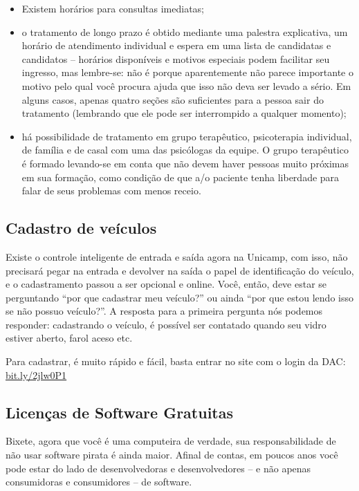 \begin{itemize}
\item Existem horários para consultas imediatas; %

\item o tratamento de longo prazo é obtido mediante uma palestra explicativa,
  um horário de atendimento individual e espera em uma lista de candidatas e
  candidatos -- horários disponíveis e motivos especiais podem facilitar seu
  ingresso, mas lembre-se: não é porque aparentemente não parece importante o
  motivo pelo qual você procura ajuda que isso não deva ser levado a sério. Em
  alguns casos, apenas quatro seções são suficientes para a pessoa sair do
  tratamento (lembrando que ele pode ser interrompido a qualquer momento);

\item há possibilidade de tratamento em grupo terapêutico, psicoterapia
  individual, de família e de casal com uma das psicólogas da equipe. O grupo
  terapêutico é formado levando-se em conta que não devem haver pessoas muito
  próximas em sua formação, como condição de que a/o paciente tenha liberdade
  para falar de seus problemas com menos receio.
\end{itemize}

\subsection{Cadastro de veículos}

Existe o controle inteligente de entrada e saída agora na Unicamp, com isso,
não precisará pegar na entrada e devolver na saída o papel de identificação do
veículo, e o cadastramento passou a ser opcional e online. Você, então, deve
estar se perguntando ``por que cadastrar meu veículo?'' ou ainda ``por que
estou lendo isso se não possuo veículo?''. A resposta para a primeira pergunta
nós podemos responder: cadastrando o veículo, é possível ser contatado quando
seu vidro estiver aberto, farol aceso etc.

Para cadastrar, é muito rápido e fácil, basta entrar no site com o login da
DAC: \url{bit.ly/2jlw0P1}

\subsection{Licenças de Software Gratuitas}

Bixete, agora que você é uma computeira de verdade, sua responsabilidade de não
usar software pirata é ainda maior. Afinal de contas, em poucos anos você pode
estar do lado de desenvolvedoras e desenvolvedores -- e não apenas consumidoras
e consumidores -- de software.

